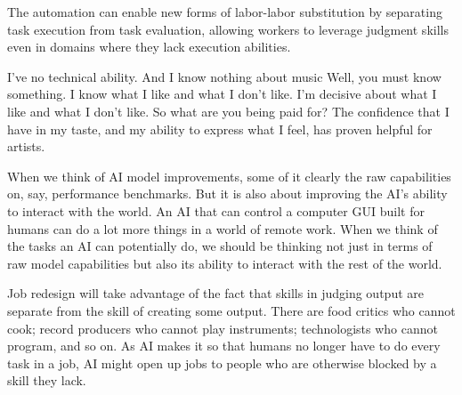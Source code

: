 \documentclass{article}
\begin{document}
The automation can enable new forms of labor-labor substitution by separating task execution from task evaluation, allowing workers to leverage judgment skills even in domains where they lack execution abilities.
\begin{dialogue}
     I've no technical ability. And I know nothing about music
     Well, you must know something.
     I know what I like and what I don't like. I'm decisive about what I like and what I don't like.
     So what are you being paid for?
     The confidence that I have in my taste, and my ability to express what I feel, has proven helpful for artists.
  \end{dialogue}
  
When we think of AI model improvements, some of it clearly the raw capabilities on, say, performance benchmarks. 
But it is also about improving the AI's ability to interact with the world. 
An AI that can control a computer GUI built for humans can do a lot more things in a world of remote work.
When we think of the tasks an AI can potentially do, we should be thinking not just in terms of raw model capabilities but also its ability to interact with the rest of the world.

Job redesign will take advantage of the fact that skills in judging output are separate from the skill of creating some output.
There are food critics who cannot cook; record producers who cannot play instruments; technologists who cannot program, and so on.
As AI makes it so that humans no longer have to do every task in a job, AI might open up jobs to people who are otherwise blocked by a skill they lack.



\end{document}
